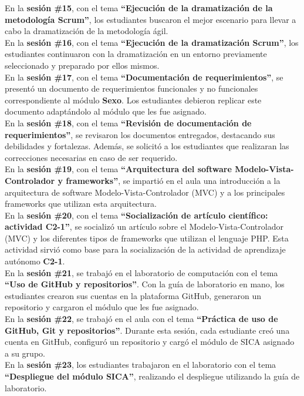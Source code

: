 \documentclass[12pt]{article}
\begin{document}
\begin{multicols}{2}
En la \textbf{sesión \#15}, con el tema \textbf{``Ejecución de la dramatización de la metodología Scrum''}, los estudiantes buscaron el mejor escenario para llevar a cabo la dramatización de la metodología ágil.\\
En la \textbf{sesión \#16}, con el tema \textbf{``Ejecución de la dramatización Scrum''}, los estudiantes continuaron con la dramatización en un entorno previamente seleccionado y preparado por ellos mismos.\\
En la \textbf{sesión \#17}, con el tema \textbf{``Documentación de requerimientos''}, se presentó un documento de requerimientos funcionales y no funcionales correspondiente al módulo \textbf{Sexo}. Los estudiantes debieron replicar este documento adaptándolo al módulo que les fue asignado.\\
En la \textbf{sesión \#18}, con el tema \textbf{``Revisión de documentación de requerimientos''}, se revisaron los documentos entregados, destacando sus debilidades y fortalezas. Además, se solicitó a los estudiantes que realizaran las correcciones necesarias en caso de ser requerido.\\
En la \textbf{sesión \#19}, con el tema \textbf{``Arquitectura del software Modelo-Vista-Controlador y frameworks''}, se impartió en el aula una introducción a la arquitectura de software Modelo-Vista-Controlador (MVC) y a los principales frameworks que utilizan esta arquitectura.\\
En la \textbf{sesión \#20}, con el tema \textbf{``Socialización de artículo científico: actividad C2-1''}, se socializó un artículo sobre el Modelo-Vista-Controlador (MVC) y los diferentes tipos de frameworks que utilizan el lenguaje PHP. Esta actividad sirvió como base para la socialización de la actividad de aprendizaje autónomo \textbf{C2-1}.\\
En la \textbf{sesión \#21}, se trabajó en el laboratorio de computación con el tema \textbf{``Uso de GitHub y repositorios''}. Con la guía de laboratorio en mano, los estudiantes crearon sus cuentas en la plataforma GitHub, generaron un repositorio y cargaron el módulo que les fue asignado.\\
En la \textbf{sesión \#22}, se trabajó en el aula con el tema \textbf{``Práctica de uso de GitHub, Git y repositorios''}. Durante esta sesión, cada estudiante creó una cuenta en GitHub, configuró un repositorio y cargó el módulo de SICA asignado a su grupo.\\
En la \textbf{sesión \#23}, los estudiantes trabajaron en el laboratorio con el tema \textbf{``Despliegue del módulo SICA''}, realizando el despliegue utilizando la guía de laboratorio.\\

\end{multicols}
\end{document}
